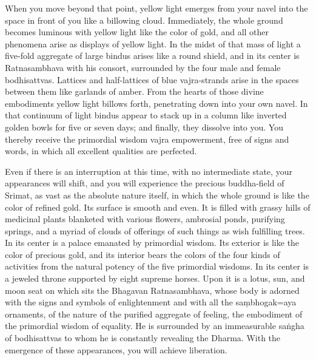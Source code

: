 \documentclass[11pt,twocolumn]{article}
\begin{document}
When you move beyond that point, yellow light emerges from your navel
into the space in front of you like a billowing cloud. Immediately,
the whole ground becomes luminous with yellow light like the color of
gold, and all other phenomena arise as displays of yellow light. In
the midst of that mass of light a five\hyp{}fold aggregate of large
bindus arises like a round shield, and in its center is Ratnasambhava
with his consort, surrounded by the four male and female
bodhisattvas. Lattices and half\hyp{}lattices of blue
vajra\hyp{}strands arise in the spaces between them like garlands of
amber. From the hearts of those divine embodiments yellow light
billows forth, penetrating down into your own navel. In that continuum
of light bindus appear to stack up in a column like inverted golden
bowls for five or seven days; and finally, they dissolve into you. You
thereby receive the primordial wisdom vajra empowerment, free of signs
and words, in which all excellent qualities are perfected.

Even if there is an interruption at this time, with no intermediate
state, your appearances will shift, and you will experience the
precious buddha\hyp{}field of Srimat, as vast as the absolute nature
itself, in which the whole ground is like the color of refined
gold. Its surface is smooth and even. It is filled with grassy hills
of medicinal plants blanketed with various flowers, ambrosial ponds,
purifying springs, and a myriad of clouds of offerings of such things
as wish fulfilling trees. In its center is a palace emanated by
primordial wisdom. Its exterior is like the color of precious gold,
and its interior bears the colors of the four kinds of activities from
the natural potency of the five primordial wisdoms. In its center is a
jeweled throne supported by eight supreme horses. Upon it is a lotus,
sun, and moon seat on which sits the Bhagavan Ratnasambhava, whose
body is adorned with the signs and symbols of enlightenment and with
all the sa\d{m}bhogak\a={a}ya ornaments, of the nature of the purified
aggregate of feeling, the embodiment of the primordial wisdom of
equality. He is surrounded by an immeasurable sa\.{n}gha of
bodhisattvas to whom he is constantly revealing the Dharma. With the
emergence of these appearances, you will achieve liberation.
\end{document}
